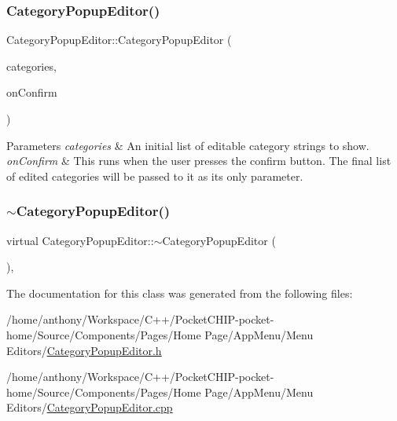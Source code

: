\subsubsection{\texorpdfstring{Category\+Popup\+Editor()}{CategoryPopupEditor()}}
{\footnotesize\ttfamily Category\+Popup\+Editor\+::\+Category\+Popup\+Editor (\begin{DoxyParamCaption}\item[{String\+Array}]{categories,  }\item[{std\+::function$<$ void(String\+Array) $>$}]{on\+Confirm }\end{DoxyParamCaption})}


\begin{DoxyParams}{Parameters}
{\em categories} & An initial list of editable category strings to show.\\
\hline
{\em on\+Confirm} & This runs when the user presses the confirm button. The final list of edited categories will be passed to it as its only parameter. \\
\hline
\end{DoxyParams}
\mbox{\label{classCategoryPopupEditor_a902911d16c13c37fa70f6c56b031f69a}} 
\subsubsection{\texorpdfstring{$\sim$\+Category\+Popup\+Editor()}{~CategoryPopupEditor()}}
{\footnotesize\ttfamily virtual Category\+Popup\+Editor\+::$\sim$\+Category\+Popup\+Editor (\begin{DoxyParamCaption}{ }\end{DoxyParamCaption})\hspace{0.3cm}{\ttfamily [inline]}, {\ttfamily [virtual]}}



The documentation for this class was generated from the following files\+:\begin{DoxyCompactItemize}
\item 
/home/anthony/\+Workspace/\+C++/\+Pocket\+C\+H\+I\+P-\/pocket-\/home/\+Source/\+Components/\+Pages/\+Home Page/\+App\+Menu/\+Menu Editors/\mbox{\hyperlink{CategoryPopupEditor_8h}{Category\+Popup\+Editor.\+h}}\item 
/home/anthony/\+Workspace/\+C++/\+Pocket\+C\+H\+I\+P-\/pocket-\/home/\+Source/\+Components/\+Pages/\+Home Page/\+App\+Menu/\+Menu Editors/\mbox{\hyperlink{CategoryPopupEditor_8cpp}{Category\+Popup\+Editor.\+cpp}}\end{DoxyCompactItemize}
